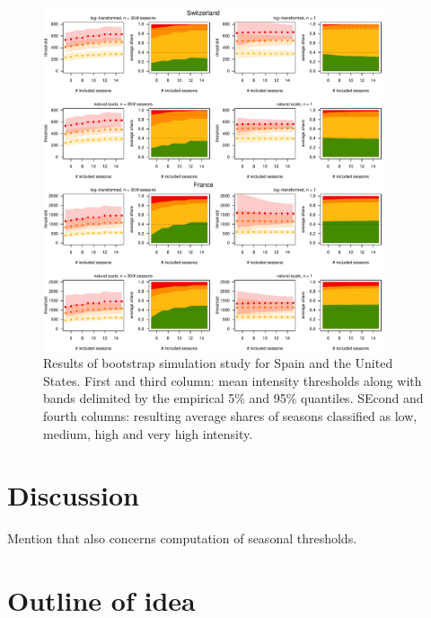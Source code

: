\documentclass{article}
\begin{document}
\begin{figure}
\includegraphics[page=2, width=0.9\textwidth]{figure/plot_results.pdf}
\caption{Results of bootstrap simulation study for Spain and the United States. First and third column: mean intensity thresholds along with bands delimited by the empirical 5\% and 95\% quantiles. SEcond and fourth columns: resulting average shares of seasons classified as low, medium, high and very high intensity.}
\label{fig:results2}
\end{figure}


\section{Discussion}
\label{sec:discussion}

Mention that also concerns computation of seasonal thresholds.

\section*{Outline of idea}
\end{document}
